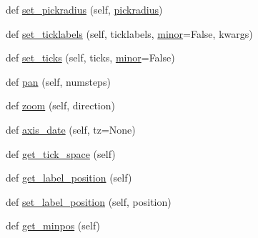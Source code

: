 \begin{DoxyCompactItemize}
\item 
def \hyperlink{classmatplotlib_1_1axis_1_1Axis_a356334b77e5effa0a6c3e65a223e3274}{set\+\_\+pickradius} (self, \hyperlink{classmatplotlib_1_1axis_1_1Axis_a25dc1b86cf6496a71d340ae4bb4f1c96}{pickradius})
\item 
def \hyperlink{classmatplotlib_1_1axis_1_1Axis_ae329fbb2fee5ba8d3274da71194baa18}{set\+\_\+ticklabels} (self, ticklabels, \hyperlink{classmatplotlib_1_1axis_1_1Axis_aee64f69c8c9efa6020be9cdefe5dbb49}{minor}=False, kwargs)
\item 
def \hyperlink{classmatplotlib_1_1axis_1_1Axis_a255ffd4e4c5ab47df42115b519a1c4f4}{set\+\_\+ticks} (self, ticks, \hyperlink{classmatplotlib_1_1axis_1_1Axis_aee64f69c8c9efa6020be9cdefe5dbb49}{minor}=False)
\item 
def \hyperlink{classmatplotlib_1_1axis_1_1Axis_a8f67cc32b23a26c75d18b68095162f4d}{pan} (self, numsteps)
\item 
def \hyperlink{classmatplotlib_1_1axis_1_1Axis_ae8bd381a48d4078556c167312ef8bea3}{zoom} (self, direction)
\item 
def \hyperlink{classmatplotlib_1_1axis_1_1Axis_a937fa76e00d5ae0f987771fb9ff2161c}{axis\+\_\+date} (self, tz=None)
\item 
def \hyperlink{classmatplotlib_1_1axis_1_1Axis_ad3f8c9b44571a6b8176103278827dc25}{get\+\_\+tick\+\_\+space} (self)
\item 
def \hyperlink{classmatplotlib_1_1axis_1_1Axis_a5f818539c66ae6ac56f68bf43fdbc0c7}{get\+\_\+label\+\_\+position} (self)
\item 
def \hyperlink{classmatplotlib_1_1axis_1_1Axis_ab689afaf99f2fe9c83ec184b6c8198e4}{set\+\_\+label\+\_\+position} (self, position)
\item 
def \hyperlink{classmatplotlib_1_1axis_1_1Axis_a5a75584d033396cd91abf06792375921}{get\+\_\+minpos} (self)
\end{DoxyCompactItemize}
